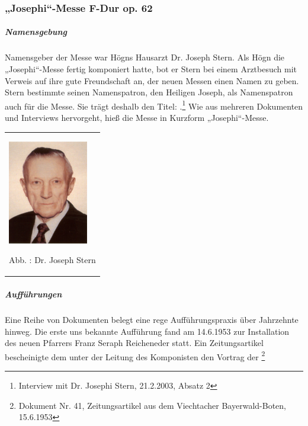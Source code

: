 \subsubsection[„Josephi“{}-Messe F{}-Dur op. 62]{„Josephi“-Messe F-Dur
op. 62}

\label{bkm:Ref98506951}\hypertarget{RefHeadingToc100333755}{}\label{bkm:Ref98506963}\label{bkm:Ref98506955}\subparagraph{Namensgebung}
Namensgeber der Messe war Högns Hausarzt Dr. Joseph Stern. Als Högn die
„Josephi“-Messe fertig komponiert hatte, bot er Stern bei einem
Arztbesuch mit Verweis auf ihre gute Freundschaft an, der neuen Messen
einen Namen zu geben. Stern bestimmte seinen Namenspatron, den Heiligen
Joseph, als Namenspatron auch für die Messe. Sie trägt deshalb den
Titel: .\footnote{
Interview mit Dr. Josephi Stern, 21.2.2003, Absatz 2} Wie aus mehreren
Dokumenten und Interviews hervorgeht, hieß die Messe in Kurzform
„Josephi“-Messe.

\begin{center}
\begin{minipage}{3.884cm}
\begin{flushleft}
\tablefirsthead{}
\tablehead{}
\tabletail{}
\tablelasttail{}
\begin{supertabular}{m{3.684cm}}

\includegraphics[width=3.501cm,height=4.533cm]{pictures/zulassungsarbeit-img106.jpg}

Abb. : Dr. Joseph Stern\\
\end{supertabular}
\end{flushleft}
\end{minipage}
\end{center}
\subparagraph{Aufführungen}
Eine Reihe von Dokumenten belegt eine rege Aufführungspraxis über
Jahrzehnte hinweg. Die erste uns bekannte Aufführung fand am 14.6.1953
zur Installation des neuen Pfarrers Franz Seraph Reicheneder statt. Ein
Zeitungsartikel bescheinigte dem 
unter der Leitung des Komponisten den 
Vortrag der  \footnote{Dokument
Nr. 41, Zeitungsartikel aus dem Viechtacher Bayerwald-Boten, 15.6.1953}

